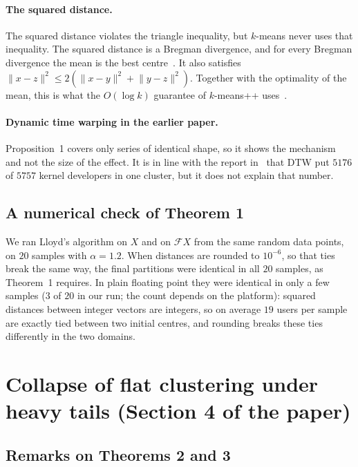 \documentclass[11pt]{article}
\newcommand{\F}{\mathcal{F}}
\newcommand{\norm}[1]{\lVert #1 \rVert}
\theoremstyle{remark}\newtheorem{remark}{Remark}\renewcommand{\theremark}{S\arabic{remark}}
\begin{document}
\paragraph{The squared distance.} The squared distance violates the triangle inequality, but $k$-means never uses that inequality. The squared distance is a Bregman divergence, and for every Bregman divergence the mean is the best centre~\cite{banerjee2005bregman}. It also satisfies $\norm{x-z}^2\le2(\norm{x-y}^2+\norm{y-z}^2)$. Together with the optimality of the mean, this is what the $O(\log k)$ guarantee of $k$-means++ uses~\cite{arthur2007kmeanspp}.

\paragraph{Dynamic time warping in the earlier paper.} Proposition~1 covers only series of identical shape, so it shows the mechanism and not the size of the effect. It is in line with the report in~\cite{sinha2020hierarchical} that DTW put $5176$ of $5757$ kernel developers in one cluster, but it does not explain that number.

\subsection*{A numerical check of Theorem 1}
We ran Lloyd's algorithm on $X$ and on $\F X$ from the same random data points, on $20$ samples with $\alpha=1.2$. When distances are rounded to $10^{-6}$, so that ties break the same way, the final partitions were identical in all $20$ samples, as Theorem~1 requires. In plain floating point they were identical in only a few samples ($3$ of $20$ in our run; the count depends on the platform): squared distances between integer vectors are integers, so on average $19$ users per sample are exactly tied between two initial centres, and rounding breaks these ties differently in the two domains.

\section{Collapse of flat clustering under heavy tails (Section 4 of the paper)}\label{s:collapse}

\subsection*{Remarks on Theorems 2 and 3}
\end{document}

